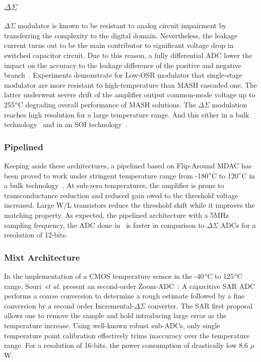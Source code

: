 \subsubsection{$\Delta\Sigma$}
\(\Delta\Sigma \) modulator is known to be resistant to analog circuit impairment by transferring the complexity to the digital domain. Nevertheless, the leakage current turns out to be the main contributor to significant voltage drop in switched capacitor circuit. Due to this reason, a fully differential ADC lower the impact on the accuracy to the leakage difference of the positive and negative branch~\cite{Davis2003}. Experiments demonstrate for Low-OSR modulator that single-stage modulator are more resistant to high-temperature than MASH cascaded one. The latter underwent severe drift of the amplifier output common-mode voltage up to 255\(\degree \)C degrading overall performance of MASH solutions. The $\Delta\Sigma$ modulation reaches high resolution for a large temperature range. And this either in a bulk technology~\cite{Davis2003} and in an SOI technology~\cite{ Ericson2004}.

\subsubsection{Pipelined}
Keeping aside these architectures, a pipelined based on Flip-Around MDAC has been proved to work under stringent temperature range from -180\(\degree \)C to 120\(\degree \)C in a bulk technology~\cite{Yao2010}. At sub-zero temperatures, the amplifier is prone to transconductance reduction and reduced gain owed to the threshold voltage increased. Large W/L transistors reduce the threshold shift while it improves the matching property. As expected, the pipelined architecture with a 5MHz sampling frequency, the ADC done in~\cite{Yao2010} is faster in comparison to $\Delta\Sigma$ ADCs for a resolution of 12-bits.

\subsubsection{Mixt Architecture}
In the implementation of a CMOS temperature sensor in the -40\(\degree \)C to 125\(\degree \)C range, Souri~\textit{et al.} present an second-order Zoom-ADC~\cite{Souri2014}: A capacitive SAR ADC performs a coarse conversion to determine a rough estimate followed by a fine conversion by a second order Incremental-\(\Delta\Sigma \) converter. The SAR first proposal allows one to remove the sample and hold introducing large error as the temperature increase. Using well-known robust sub-ADCs, only single temperature point calibration effectively trims inaccuracy over the temperature range. For a resolution of 16-bits, the power consumption of drastically low 8.6 $\mu$W.

